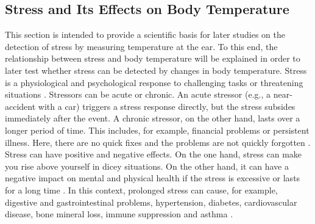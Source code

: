 
\subsection{Stress and Its Effects on Body Temperature}
This section is intended to provide a scientific basis for later studies on the detection of stress by measuring temperature at the ear. 
To this end, the relationship between stress and body temperature will be explained in order to later test whether stress can be detected by changes in body temperature.
Stress is a physiological and psychological response to challenging tasks or threatening situations \cite{jamesUnderstandingRelationshipsPhysiological2023}. 
Stressors can be acute or chronic.
An acute stressor (e.g., a near-accident with a car) triggers a stress response directly, but the stress subsides immediately after the event.
A chronic stressor, on the other hand, lasts over a longer period of time. 
This includes, for example, financial problems or persistent illness.
Here, there are no quick fixes and the problems are not quickly forgotten \cite{baumControlIntrusiveMemories1993}.
Stress can have positive and negative effects.
On the one hand, stress can make you rise above yourself in dicey situations.
On the other hand, it can have a negative impact on mental and physical health if the stress is excessive or lasts for a long time \cite{jamesUnderstandingRelationshipsPhysiological2023}.
In this context, prolonged stress can cause, for example, digestive and gastrointestinal problems, hypertension, diabetes, cardiovascular disease, bone mineral loss, immune suppression and asthma \cite{merabetHowExposureChronic2022, dhamaBiomarkersStressRelated2019, petriePrevalencePTSDCommon2018}.

